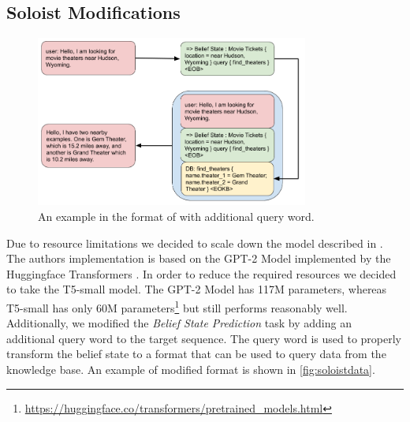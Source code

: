 \documentclass[twocolumn]{tum-article}
\begin{document}
\subsection{Soloist Modifications}
\label{sec:soloist_mod}
\begin{figure}[!h]
\centering
\includegraphics[width=0.8\textwidth]{figures/Soloist_Data.png}
\caption{An example in the format of \cite{peng2020soloist} with additional query word.}
\label{fig:soloistdata}
\end{figure}
Due to resource limitations we decided to scale down the model described in \cite{peng2020soloist}. The authors implementation is based on the GPT-2 Model \cite{radford2019language} implemented by the Huggingface Transformers \cite{wolf2019huggingface}. In order to reduce the required resources we decided to take the T5-small \cite{raffel2019exploring} model. The GPT-2 Model has 117M parameters, whereas T5-small has only 60M parameters\footnote{\url{https://huggingface.co/transformers/pretrained_models.html}} but still performs reasonably well.
Additionally, we modified the \textit{Belief State Prediction} task by adding an additional query word to the target sequence. The query word is used to properly transform the belief state to a format that can be used to query data from the knowledge base. An example of modified format is shown in \autoref{fig:soloistdata}. 
\end{document}
